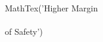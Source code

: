 \documentclass[preview]{standalone}
\begin{document}
\begin{center}
MathTex('Higher Margin \\\\of Safety')
\end{center}
\end{document}
